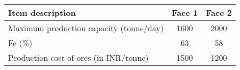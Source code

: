 \begin{center}
  \label{tab:faces-data}
  \begin{tabular}{|l|c|c|}
    \hline
    \textbf{Item description} & \textbf{Face 1} & \textbf{Face 2} \\ \hline
    Maximum production capacity (tonne/day) & 1600 & 2000 \\ \hline
    Fe (\%) & 63 & 58 \\ \hline
    Production cost of ores (in INR/tonne) & 1500 & 1200 \\ \hline
  \end{tabular}
\end{center}
